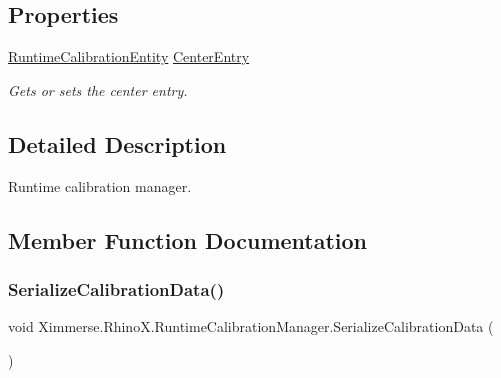 \subsection*{Properties}
\begin{DoxyCompactItemize}
\item 
\mbox{\hyperlink{class_ximmerse_1_1_rhino_x_1_1_runtime_calibration_entity}{Runtime\+Calibration\+Entity}} \mbox{\hyperlink{class_ximmerse_1_1_rhino_x_1_1_runtime_calibration_manager_a1202f2b01cb1c6e6ee7f332ee0ad9e97}{Center\+Entry}}
\begin{DoxyCompactList}\small\item\em Gets or sets the center entry. \end{DoxyCompactList}\end{DoxyCompactItemize}


\subsection{Detailed Description}
Runtime calibration manager. 



\subsection{Member Function Documentation}
\mbox{\label{class_ximmerse_1_1_rhino_x_1_1_runtime_calibration_manager_a2eed7edd69a12c8ff0d3f8b4feb60f49}} 
\subsubsection{\texorpdfstring{Serialize\+Calibration\+Data()}{SerializeCalibrationData()}}
{\footnotesize\ttfamily void Ximmerse.\+Rhino\+X.\+Runtime\+Calibration\+Manager.\+Serialize\+Calibration\+Data (\begin{DoxyParamCaption}{ }\end{DoxyParamCaption})}



